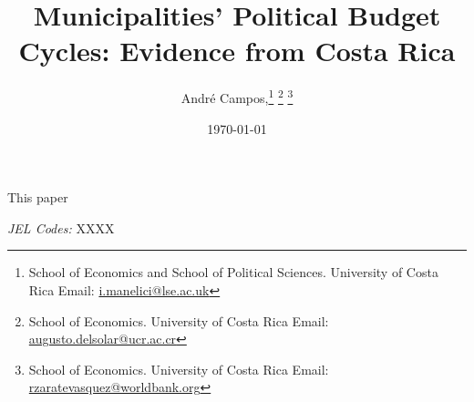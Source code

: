 \documentclass[12pt,a4paper]{article}
\title{\huge{Municipalities' Political Budget Cycles: Evidence from Costa Rica}}\thanks{\footnotesize We thank ....}
\author{\large \vspace{0.5cm} André Campos,\thanks{School of Economics and School of Political Sciences. University of Costa Rica Email: \href{mailto:i.manelici@lse.ac.uk}{i.manelici@lse.ac.uk}}
\text{ Augusto del Solar}\thanks{School of Economics. University of Costa Rica Email: \href{mailto:augusto.delsolar@ucr.ac.cr}{augusto.delsolar@ucr.ac.cr}}
\text{ and José I. González Rojas, }\thanks{School of Economics. University of Costa Rica Email: \href{mailto:rzaratevasquez@worldbank.org}{rzaratevasquez@worldbank.org}}
}
\date{\today}
\begin{document}
\onehalfspacing
\setlength{\parindent}{1cm}
\clearpage\maketitle
\thispagestyle{empty}
\setcounter{page}{0}
\maketitle

\begin{small}
\onehalfspacing
\vspace{0.75cm}
This paper 
\vspace{20pt}

\textit{JEL Codes:} XXXX
\end{small}


\end{document}
